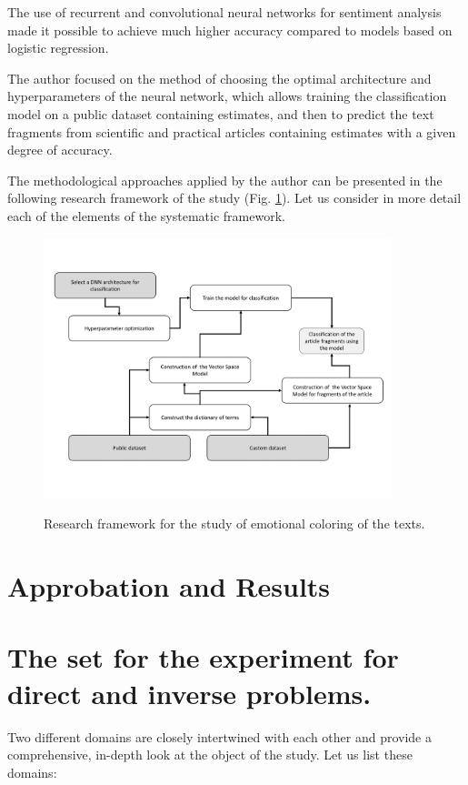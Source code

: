 \documentclass[12pt]{report}
\theoremstyle{definition}
\begin{document}
The use of recurrent and convolutional neural networks for sentiment analysis made it possible to achieve much higher accuracy compared to models based on logistic regression.

The author focused on the method of choosing the optimal architecture and hyperparameters of the neural network, which allows training the classification model on a public dataset containing estimates, and then to predict the text fragments from scientific and practical articles containing estimates with a given degree of accuracy.

The methodological approaches applied by the author can be presented in the following research framework of the study (Fig. \ref{fig:op4_1}). 
Let us consider in more detail each of the elements of the systematic framework.

\begin{figure}[ht]
	\centering
	\includegraphics[width=0.9\textwidth]{op4_1eng}
	\label{fig:op4_1}
	\caption{Research framework for the study of emotional coloring of the texts.}
\end{figure}  

\section {Approbation and Results}
\section {The set for the experiment for direct and inverse problems.}

Two different domains are closely intertwined with each other and provide a comprehensive, in-depth look at the object of the study. 
Let us list these domains:
\end{document}
